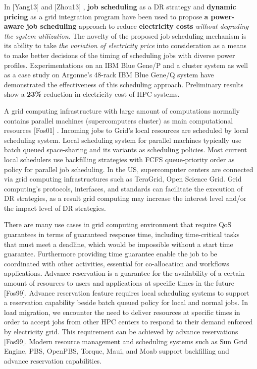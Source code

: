 \documentclass{llncs}
\begin{document}
In [Yang13] and [Zhou13] , \textbf{job scheduling} as a DR strategy and
\textbf{dynamic pricing} as a grid integration program have been used to
propose \textbf{a power-aware job scheduling} approach to reduce
\textbf{electricity costs} \textit{without degrading the system utilization}. 
The novelty of the proposed job scheduling
mechanism is its ability to take \textit{the variation of 
electricity price }into consideration as a means to make
better decisions of the timing of scheduling jobs with diverse power
profiles. Experimentations on an IBM Blue Gene/P and a cluster system as
well as a case study on Argonne's 48-rack IBM Blue Gene/Q system have
demonstrated the effectiveness of this scheduling approach. Preliminary
results show a \textbf{23{\%}} reduction in electricity cost of HPC systems.

A grid computing infrastructure with large amount of computations normally
contains parallel machines (supercomputers cluster) as main computational
resources [Fos01]
. Incoming jobs to Grid's local resources are scheduled by
local scheduling system. Local scheduling system for parallel machines
typically use batch queued space-sharing and its variants as scheduling
policies. Most current local schedulers use backfilling strategies with FCFS
queue-priority order as policy for parallel job scheduling. In the US,
supercomputer centers are connected via grid computing infrastructures such
as TeraGrid, Open Science Grid. Grid computing's protocols, interfaces, and
standards can facilitate the execution of DR strategies, as a result grid
computing may increase the interest level and/or the impact level of DR
strategies.

There are many use cases in grid computing environment that require QoS
guarantees in terms of guaranteed response time, including time-critical
tasks that must meet a deadline, which would be impossible without a start
time guarantee. Furthermore providing time guarantee enable the job to be
coordinated with other activities, essential for co-allocation and workflows
applications. Advance reservation is a guarantee for the availability of a
certain amount of resources to users and applications at specific times in
the future [Fos99]. Advance reservation feature requires local scheduling
systems to support a reservation capability beside batch queued policy for
local and normal jobs. In load migration, we encounter the need to deliver
resources at specific times in order to accept jobs from other HPC centers
to respond to their demand enforced by electricity grid. This requirement
can be achieved by advance reservations [Fos99]. Modern resource management
and scheduling systems such as Sun Grid Engine, PBS, OpenPBS, Torque, Maui,
and Moab support backfilling and advance reservation capabilities.
\end{document}
